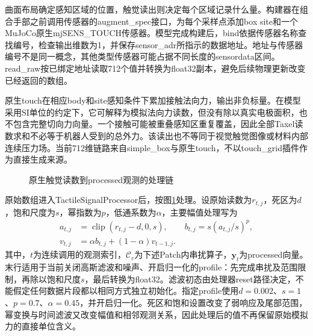 曲面布局确定感知区域的位置，触觉读出则决定每个区域记录什么量。构建器在组合手部之前调用传感器的augment\_spec接口，为每个采样点添加box site和一个MuJoCo原生mjSENS\_TOUCH传感器。模型完成构建后，bind依据传感器名称查找编号，检查输出维数为1，并保存sensor\_adr所指示的数据地址。地址与传感器编号不是同一概念，其他类型传感器可能占据不同长度的sensordata区间。read\_raw按已绑定地址读取712个值并转换为float32副本，避免后续物理更新改变已经返回的数组。

原生touch在相应body和site感知条件下累加接触法向力，输出非负标量\cite{mujoco2026xml}。在模型采用SI单位的约定下，它可解释为模拟法向力读数，但没有除以真实电极面积，也不包含完整切向力向量。一个接触可能被重叠感知区重复覆盖，因此全部Taxel读数求和不必等于机器人受到的总外力。该读出也不等同于视觉触觉图像或材料内部连续压力场\cite{si2022taxim,sferrazza2022simtoreal}。当前712维链路来自simple\_box与原生touch，不以touch\_grid插件作为直接生成来源。

\begin{figure}[htbp]
  \centering
  \caption{原生触觉读数到processed观测的处理链}
  \label{fig:ch02_processing}
\end{figure}

原始数组进入TactileSignalProcessor后，按图\ref{fig:ch02_processing}处理。设原始读数为$r_{t,j}$，死区为$d$，饱和尺度为$s$，幂指数为$p$，低通系数为$\alpha$，主要幅值处理写为
\begin{equation}
 \begin{aligned}
 a_{t,j}&=\operatorname{clip}(r_{t,j}-d,0,s),\qquad
 b_{t,j}=s(a_{t,j}/s)^p,\\
 v_{t,j}&=\alpha b_{t,j}+(1-\alpha)v_{t-1,j}.
 \end{aligned}
 \label{eq:ch02_processing}
\end{equation}
其中，$t$为连续调用的观测索引，$\mathcal C_c$为下述Patch内串扰算子，$\boldsymbol y_t$为processed向量。末行适用于当前关闭高斯滤波和噪声、开启归一化的profile：先完成串扰及范围限制，再除以饱和尺度$s$，最后转换为float32。滤波初态由处理器reset路径决定，不能假定任何数据片段都以相同方式独立初始化。指定profile使用$d=0.002$、$s=1$、$p=0.7$、$\alpha=0.45$，并开启归一化。死区和饱和设置改变了弱响应及尾部范围，幂变换与时间滤波又改变幅值和相邻观测关系，因此处理后的值不再保留原始模拟力的直接单位含义。

